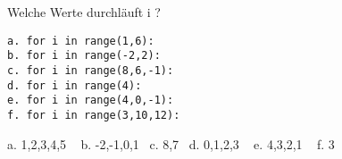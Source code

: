 \question[3] Welche Werte durchläuft i ? 
\begin{lstlisting}
a. for i in range(1,6):
b. for i in range(-2,2):
c. for i in range(8,6,-1):
d. for i in range(4):
e. for i in range(4,0,-1):
f. for i in range(3,10,12):
\end{lstlisting}
\begin{solutionbox}{3cm}
a. 1,2,3,4,5 ~ b. -2,-1,0,1~ c. 8,7 ~d. 0,1,2,3 ~ e. 4,3,2,1 ~ f. 3
\end{solutionbox}
